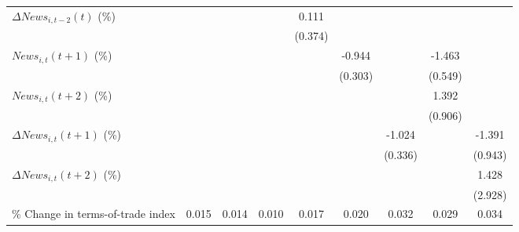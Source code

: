 {\begin{tabular}{l*{8}{c}}
\addlinespace
$ \Delta News_{i,t-2}(t)$ (\%)&                     &                     &                     &       0.111         &                     &                     &                     &                     \\
                    &                     &                     &                     &     (0.374)         &                     &                     &                     &                     \\
\addlinespace
$ News_{i,t}(t+1)$ (\%)&                     &                     &                     &                     &      -0.944\sym{***}&                     &      -1.463\sym{***}&                     \\
                    &                     &                     &                     &                     &     (0.303)         &                     &     (0.549)         &                     \\
\addlinespace
$ News_{i,t}(t+2)$ (\%)&                     &                     &                     &                     &                     &                     &       1.392         &                     \\
                    &                     &                     &                     &                     &                     &                     &     (0.906)         &                     \\
\addlinespace
$ \Delta News_{i,t}(t+1)$ (\%)&                     &                     &                     &                     &                     &      -1.024\sym{***}&                     &      -1.391         \\
                    &                     &                     &                     &                     &                     &     (0.336)         &                     &     (0.943)         \\
\addlinespace
$ \Delta News_{i,t}(t+2)$ (\%)&                     &                     &                     &                     &                     &                     &                     &       1.428         \\
                    &                     &                     &                     &                     &                     &                     &                     &     (2.928)         \\
\addlinespace
\% Change in terms-of-trade index&       0.015         &       0.014         &       0.010         &       0.017         &       0.020         &       0.032\sym{**} &       0.029\sym{**} &       0.034\sym{**} \\

\end{tabular}}

